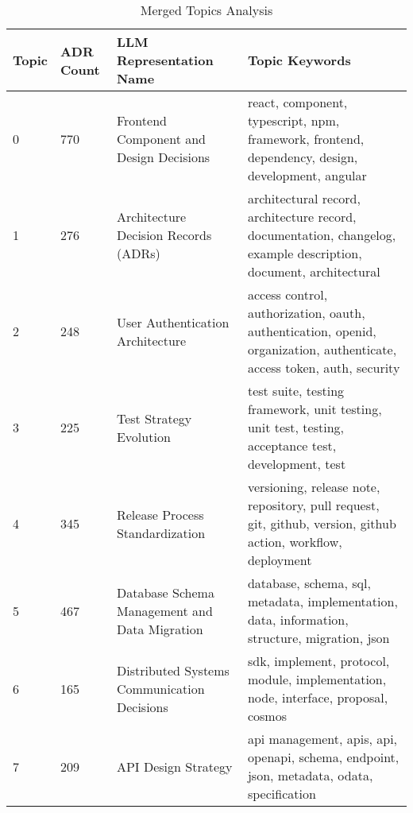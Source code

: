 \begin{longtable}{|p{1cm} p{1.12cm} p{3.3cm} p{9cm}|}
    \caption{Merged Topics Analysis} \\
    \hline
    \textbf{Topic} & \textbf{ADR Count} & \textbf{LLM Representation Name} & \textbf{Topic Keywords} \\
    \hline
    \endfirsthead
    
    
    
    \endhead
    
    
    \endfoot
    
    
    \endlastfoot
    
    0 & 770 & Frontend Component and Design Decisions & react, component, typescript, npm, framework, frontend, dependency, design, development, angular \\
    
    1 & 276 & Architecture Decision Records (ADRs) & architectural record, architecture record, documentation, changelog, example description, document, architectural \\
    
    2 & 248 & User Authentication Architecture & access control, authorization, oauth, authentication, openid, organization, authenticate, access token, auth, security \\
    
    3 & 225 & Test Strategy Evolution & test suite, testing framework, unit testing, unit test, testing, acceptance test, development, test \\
    
    4 & 345 & Release Process Standardization & versioning, release note, repository, pull request, git, github, version, github action, workflow, deployment \\
    
    5 & 467 & Database Schema Management and Data Migration & database, schema, sql, metadata, implementation, data, information, structure, migration, json \\
    
    6 & 165 & Distributed Systems Communication Decisions & sdk, implement, protocol, module, implementation, node, interface, proposal, cosmos \\
    
    7 & 209 & API Design Strategy & api management, apis, api, openapi, schema, endpoint, json, metadata, odata, specification \\
    

\end{longtable}
